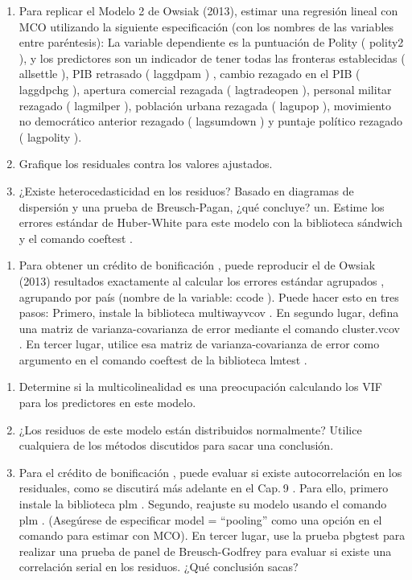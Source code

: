 \documentclass[
]{book}
\providecommand{\tightlist}{%
  \setlength{\itemsep}{0pt}\setlength{\parskip}{0pt}}
\begin{document}
\begin{enumerate}
\def\labelenumi{\arabic{enumi}.}
\setcounter{enumi}{1}
\item
  Para replicar el Modelo 2 de Owsiak (2013), estimar una regresión lineal con MCO utilizando la siguiente especificación (con los nombres de las variables entre paréntesis): La variable dependiente es la puntuación de Polity ( polity2 ), y los predictores son un indicador de tener todas las fronteras establecidas ( allsettle ), PIB retrasado ( laggdpam ) , cambio rezagado en el PIB ( laggdpchg ), apertura comercial rezagada ( lagtradeopen ), personal militar rezagado ( lagmilper ), población urbana rezagada ( lagupop ), movimiento no democrático anterior rezagado ( lagsumdown ) y puntaje político rezagado ( lagpolity ).
\item
  Grafique los residuales contra los valores ajustados.
\item
  ¿Existe heterocedasticidad en los residuos? Basado en diagramas de dispersión y una prueba de Breusch-Pagan, ¿qué concluye?
  un.
  Estime los errores estándar de Huber-White para este modelo con la biblioteca sándwich y el comando coeftest .
\end{enumerate}

\begin{enumerate}
\def\labelenumi{\Alph{enumi}.}
\setcounter{enumi}{1}
\tightlist
\item
  Para obtener un crédito de bonificación , puede reproducir el de Owsiak (2013) resultados exactamente al calcular los errores estándar agrupados , agrupando por país (nombre de la variable: ccode ). Puede hacer esto en tres pasos: Primero, instale la biblioteca multiwayvcov . En segundo lugar, defina una matriz de varianza-covarianza de error mediante el comando cluster.vcov . En tercer lugar, utilice esa matriz de varianza-covarianza de error como argumento en el comando coeftest de la biblioteca lmtest .
\end{enumerate}

\begin{enumerate}
\def\labelenumi{\arabic{enumi}.}
\setcounter{enumi}{4}
\item
  Determine si la multicolinealidad es una preocupación calculando los VIF para los predictores en este modelo.
\item
  ¿Los residuos de este modelo están distribuidos normalmente? Utilice cualquiera de los métodos discutidos para sacar una conclusión.
\item
  Para el crédito de bonificación , puede evaluar si existe autocorrelación en los residuales, como se discutirá más adelante en el Cap. 9 . Para ello, primero instale la biblioteca plm . Segundo, reajuste su modelo usando el comando plm . (Asegúrese de especificar model = ``pooling'' como una opción en el comando para estimar con MCO). En tercer lugar, use la prueba pbgtest para realizar una prueba de panel de Breusch-Godfrey para evaluar si existe una correlación serial en los residuos. ¿Qué conclusión sacas?
\end{enumerate}
\end{document}
